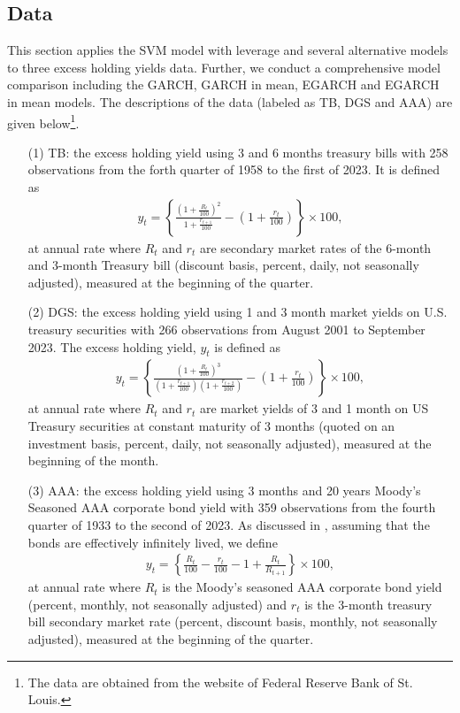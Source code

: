 \subsection{Data}
This section applies the SVM model with leverage and several alternative models to three excess holding yields data. Further, we conduct a comprehensive model comparison including the GARCH, GARCH in mean, EGARCH and EGARCH in mean models. The descriptions of the data (labeled as TB, DGS and AAA) are given below\footnote{The data are obtained from the website of Federal Reserve Bank of St. Louis.}.
\begin{enumerate}
    \item[(1)] TB: the excess holding yield using 3 and 6 months treasury bills with 258 observations from the forth quarter of 1958 to the first of 2023. It is defined as
    \begin{eqnarray*}
         y_t = \left\{\frac{\left(1+\frac{R_t}{100}\right)^2}{1+\frac{r_{t+1}}{100}} -\left(1+\frac{r_t}{100}\right)\right\}\times 100, 
    \end{eqnarray*}
    at annual rate where $R_t$ and $r_t$ are secondary market rates of the 6-month and 3-month Treasury bill (discount basis, percent, daily, not seasonally adjusted), measured at the beginning of the quarter.
  
    \item[(2)] DGS: the excess holding yield using 1 and 3 month market yields on U.S. treasury securities with 266 observations from August 2001 to September 2023. The excess holding yield, $y_t$ is defined as
        \begin{eqnarray*}
         y_t = \left\{\frac{\left(1+\frac{R_t}{100}\right)^3}{\left(1+\frac{r_{t+1}}{100}\right)\left(1+\frac{r_{t+2}}{100}\right)} -\left(1+\frac{r_t}{100}\right)\right\}\times 100, 
    \end{eqnarray*}
    at annual rate where $R_t$ and $r_t$ are market yields of 3 and 1 month on US Treasury securities at constant maturity of 3 months (quoted on an investment basis, percent, daily, not seasonally adjusted), measured at the beginning of the month.
    
    \item[(3)] AAA: the excess holding yield using 3 months and 20 years Moody's Seasoned AAA corporate bond yield with 359 observations from the fourth quarter of 1933 to the second of 2023.  As discussed in \cite{EngelLilienRobins(87)}, assuming that the bonds are effectively infinitely lived, we define 
        \begin{eqnarray*}
         y_t = \left\{\frac{R_t}{100}-\frac{r_{t}}{100} - 1 + \frac{R_{t}}{R_{t+1}}\right\} \times 100, 
    \end{eqnarray*}
     at annual rate where $R_t$ is the Moody's seasoned AAA corporate bond yield (percent, monthly, not seasonally adjusted) and $r_t$ is the 3-month treasury bill secondary market rate (percent, discount basis, monthly, not seasonally adjusted), measured at the beginning of the quarter.
     
\end{enumerate}
